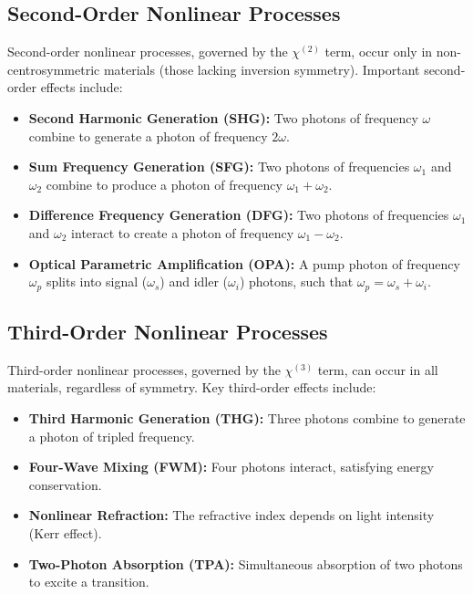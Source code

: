 \subsection{Second-Order Nonlinear Processes}
\label{subsec:second_order}

\noindent Second-order nonlinear processes, governed by the $\chi^{(2)}$ term, occur only in non-centrosymmetric materials (those lacking inversion symmetry). Important second-order effects include:

\begin{itemize}
    \item \textbf{Second Harmonic Generation (SHG):} Two photons of frequency $\omega$ combine to generate a photon of frequency $2\omega$.
    \item \textbf{Sum Frequency Generation (SFG):} Two photons of frequencies $\omega_1$ and $\omega_2$ combine to produce a photon of frequency $\omega_1 + \omega_2$.
    \item \textbf{Difference Frequency Generation (DFG):} Two photons of frequencies $\omega_1$ and $\omega_2$ interact to create a photon of frequency $\omega_1 - \omega_2$.
    \item \textbf{Optical Parametric Amplification (OPA):} A pump photon of frequency $\omega_p$ splits into signal ($\omega_s$) and idler ($\omega_i$) photons, such that $\omega_p = \omega_s + \omega_i$.
\end{itemize}

\subsection{Third-Order Nonlinear Processes}
\label{subsec:third_order}

\noindent Third-order nonlinear processes, governed by the $\chi^{(3)}$ term, can occur in all materials, regardless of symmetry. Key third-order effects include:

\begin{itemize}
    \item \textbf{Third Harmonic Generation (THG):} Three photons combine to generate a photon of tripled frequency.
    \item \textbf{Four-Wave Mixing (FWM):} Four photons interact, satisfying energy conservation.
    \item \textbf{Nonlinear Refraction:} The refractive index depends on light intensity (Kerr effect).
    \item \textbf{Two-Photon Absorption (TPA):} Simultaneous absorption of two photons to excite a transition.
\end{itemize}

